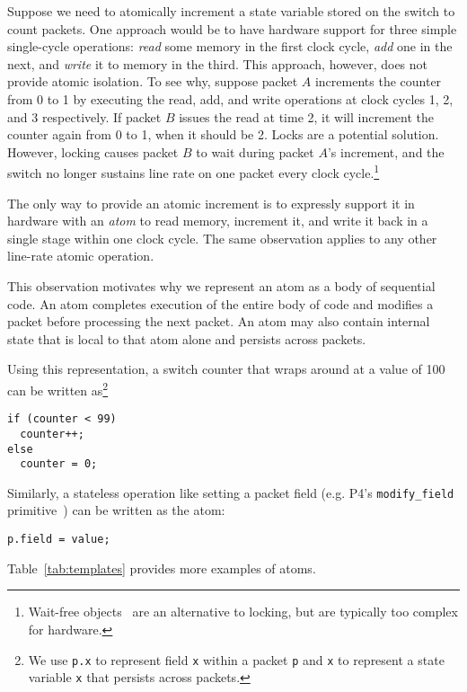Suppose we need to atomically increment a state variable stored on the
switch to count packets. One approach would be to have hardware
support for three simple single-cycle operations: \textit{read} some
memory in the first clock cycle, \textit{add} one in the next, and
\textit{write} it to memory in the third. This approach, however, does
not provide atomic isolation. To see why, suppose packet $A$
increments the counter from 0 to 1 by executing the read, add, and
write operations at clock cycles 1, 2, and 3 respectively.  If packet
$B$ issues the read at time 2, it will increment the counter again
from 0 to 1, when it should be 2. Locks are a potential
solution. However, locking causes packet $B$ to wait during packet
$A$'s increment, and the switch no longer sustains line rate on one
packet every clock cycle.\footnote{Wait-free
  objects~\cite{herlihy_wait} are an alternative to locking, but are
  typically too complex for hardware.}


The only way to provide an atomic increment is to expressly support it
in hardware with an {\em atom} to read memory, increment it, and write
it back in a single stage within one clock cycle. The same observation
applies to any other line-rate atomic operation.  

This observation motivates why we represent an atom as a body of
sequential code. An atom completes execution of the entire body of
code and modifies a packet before processing the next packet.  An atom
may also contain internal state that is local to that atom alone and
persists across packets.

Using this representation, a switch counter that wraps around at a
value of 100 can be written as\footnote{We use {\tt p.x} to
  represent field {\tt x} within a packet {\tt p} and {\tt x} to
  represent a state variable {\tt x} that persists across packets.}
\begin{lstlisting}[style=customc, numbers=none, frame=none]
if (counter < 99)
  counter++;
else
  counter = 0;
\end{lstlisting}
Similarly, a stateless operation like setting a packet field
(e.g. P4's {\tt modify\_field} primitive~\cite{p4spec}) can be written
as the atom:
\begin{lstlisting}[style=customc, numbers=none, frame=none]
  p.field = value;
\end{lstlisting}
Table~\ref{tab:templates} provides more examples of atoms.

